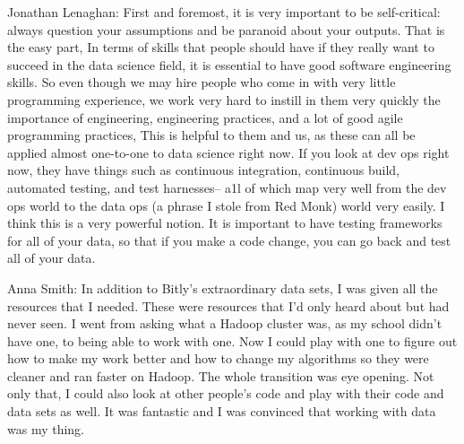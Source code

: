 Jonathan Lenaghan: First and foremost, it is very important
to be self-critical: always question your assumptions
and be paranoid about your outputs. That is the easy
part, In terms of skills that people should have if they
really want to succeed in the data science field, it is
essential to have good software engineering skills. So
even though we may hire people who come in with
very little programming experience, we work very
hard to instill in them very quickly the importance of
engineering, engineering practices, and a lot of good
agile programming practices, This is helpful to them
and us, as these can all be applied almost one-to-one
to data science right now.
If you look at dev ops right now, they have things
such as continuous integration, continuous build,
automated testing, and test harnesses-- a1l of which
map very well from the dev ops world to the data ops
(a phrase I stole from Red Monk) world very easily. I
think this is a very powerful notion. It is important to
have testing frameworks for all of your data, so that if
you make a code change, you can go back and test all
of your data. %


Anna Smith: In addition to Bitly’s extraordinary data sets,
I was given all the resources that I needed. These were
resources that I’d only heard about but had never
seen. I went from asking what a Hadoop cluster was,
as my school didn't have one, to being able to work
with one. Now I could play with one to figure out how
to make my work better and how to change my
algorithms so they were cleaner and ran faster on
Hadoop. The whole transition was eye opening. Not
only that, I could also look at other people’s code and
play with their code and data sets as well. It was
fantastic and I was convinced that working with data
was my thing.
